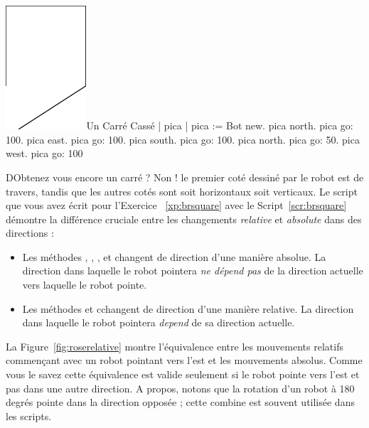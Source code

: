 \documentclass[a4paper,10pt,twoside]{book}
\begin{document}
\begin{scriptfigwithsize}[0.4]{\includegraphics[width=3cm]{ChTurnbadSquare}}{Un Carr\'e Cass\'e}\label{scr:brsquare}
	| pica | 
	pica := Bot new. 
	pica north. 
	pica go: 100. 
	pica east. 
	pica go: 100. 
	pica south. 
	pica go: 100. 
	pica north. 
	pica go: 50. 
	pica west. 
	pica go: 100
\end{scriptfigwithsize}

DObtenez vous encore un carr\'e ? Non ! le premier cot\'e dessin\'e par le robot est de travers, tandis que les autres cot\'es 
sont soit horizontaux soit verticaux. Le script que vous avez \'ecrit pour l'Exercice ~\ref{xp:brsquare} avec le 
Script~\ref{scr:brsquare} d\'emontre la diff\'erence cruciale entre les changements \emph{relative} et \emph{absolute}
 dans des directions : 

\begin{itemize}
\item Les m\'ethodes , , , et  changent de direction d'une mani\`ere absolue. 
La direction dans laquelle le robot pointera \emph{ne d\'epend pas} de la direction actuelle 
vers laquelle le robot pointe.
\item  Les m\'ethodes  et  cchangent de direction d'une mani\`ere relative. 
La direction dans laquelle le robot pointera \emph{depend} de sa direction actuelle. 
\end{itemize}

La Figure~\ref{fig:roserelative} montre l'\'equivalence entre les mouvements relatifs commençant avec un robot 
pointant vers l'est et les mouvements absolus. Comme vous le savez cette \'equivalence est valide seulement si 
le robot pointe vers l'est et pas dans une autre direction. A propos, notons que la rotation d'un robot \`a 
180 degr\'es pointe dans la direction oppos\'ee ; cette combine est souvent utilis\'ee dans les scripts.
\end{document}
